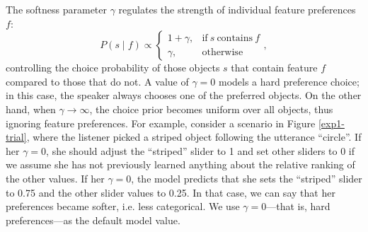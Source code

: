 \documentclass[10pt,a4paper]{article}
\begin{document}
The softness parameter $\gamma$ regulates the strength of individual feature preferences $f$:
\begin{equation}
P(s \mid f) \propto \begin{cases}
1 + \gamma, & \text{if}\ s\ \text{contains}\ f \\
\gamma, & \text{otherwise}
\end{cases},
\end{equation}
controlling the choice probability of those objects $s$ that contain feature $f$ compared to those that do not.  
A value of $\gamma=0$ models a hard preference choice; in this case, the speaker always chooses one of the preferred objects. 
On the other hand, when $\gamma \rightarrow \infty$, the choice prior becomes uniform over all objects, thus ignoring feature preferences. 
For example, consider a scenario in Figure \ref{exp1-trial}, where the listener picked a striped object following the utterance ``circle''. If her $\gamma=0$, she should adjust the ``striped'' slider to 1 and set other sliders to 0 if we assume she has not previously learned anything about the relative ranking of the other values. If her $\gamma=0$, the model predicts that she sets the ``striped'' slider to 0.75 and the other slider values to 0.25. In that case, we can say that her preferences became softer, i.e. less categorical.
% 
We use $\gamma=0$---that is, hard preferences---as the default model value.
\end{document}
